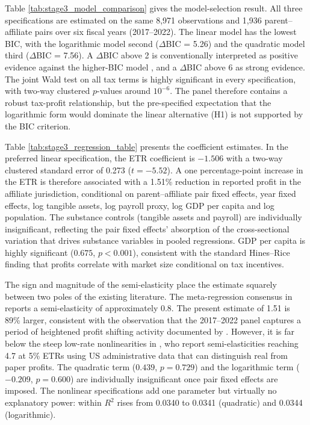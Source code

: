 \documentclass[11pt,a4paper]{article}
\begin{document}


Table \ref{tab:stage3_model_comparison} gives the model-selection result. All three specifications are estimated on the same 8{,}971 observations and 1{,}936 parent--affiliate pairs over six fiscal years (2017--2022). The linear model has the lowest BIC, with the logarithmic model second ($\Delta$BIC = 5.26) and the quadratic model third ($\Delta$BIC = 7.56). A $\Delta$BIC above 2 is conventionally interpreted as positive evidence against the higher-BIC model \citep{raftery1995}, and a $\Delta$BIC above 6 as strong evidence. The joint Wald test on all tax terms is highly significant in every specification, with two-way clustered $p$-values around $10^{-6}$. The panel therefore contains a robust tax-profit relationship, but the pre-specified expectation that the logarithmic form would dominate the linear alternative (H1) is not supported by the BIC criterion.



Table \ref{tab:stage3_regression_table} presents the coefficient estimates. In the preferred linear specification, the ETR coefficient is $-1.506$ with a two-way clustered standard error of 0.273 ($t = -5.52$). A one percentage-point increase in the ETR is therefore associated with a 1.51\% reduction in reported profit in the affiliate jurisdiction, conditional on parent--affiliate pair fixed effects, year fixed effects, log tangible assets, log payroll proxy, log GDP per capita and log population. The substance controls (tangible assets and payroll) are individually insignificant, reflecting the pair fixed effects' absorption of the cross-sectional variation that drives substance variables in pooled regressions. GDP per capita is highly significant ($0.675$, $p < 0.001$), consistent with the standard Hines--Rice finding that profits correlate with market size conditional on tax incentives.

The sign and magnitude of the semi-elasticity place the estimate squarely between two poles of the existing literature. The meta-regression consensus in \citet{heckemeyer2017} reports a semi-elasticity of approximately 0.8. The present estimate of 1.51 is 89\% larger, consistent with the observation that the 2017--2022 panel captures a period of heightened profit shifting activity documented by \citet{garcia-bernardo2022a}. However, it is far below the steep low-rate nonlinearities in \citet{dowd2017}, who report semi-elasticities reaching 4.7 at 5\% ETRs using US administrative data that can distinguish real from paper profits. The quadratic term ($0.439$, $p = 0.729$) and the logarithmic term ($-0.209$, $p = 0.600$) are individually insignificant once pair fixed effects are imposed. The nonlinear specifications add one parameter but virtually no explanatory power: within $R^2$ rises from 0.0340 to 0.0341 (quadratic) and 0.0344 (logarithmic).
\end{document}
